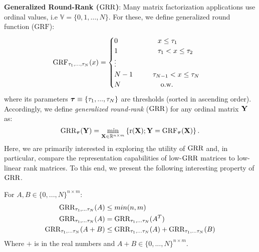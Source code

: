 \documentclass{article}
\newcommand{\sameer}[1]{\todo[color=blue!20]{\textbf{s:} #1}{}}
\newcommand{\para}[1]{\vspace{2mm}\noindent\textbf{#1}:}
\newcommand\tab[1][1cm]{\hspace*{#1}}
\begin{document}
\para{Generalized Round-Rank ($\text{GRR}$)}
\label{sec:rrabk}
Many matrix factorization applications use ordinal values, i.e $\mathbb{V}=\{0,1,\ldots,N\}$. %
For these, we define generalized round function ($\text{GRF}$): %
\begin{align}
\text{GRF}_{\tau_1,...,\tau_N}(x)=
\begin{cases}
               0\tab\tab x \leq \tau_1\\
               1\tab\tab \tau_1 < x \leq \tau_2\\
               \vdots\\
               N-1\tab \tau_{N-1} < x \leq \tau_{N}\\
               N\tab\tab \text{o.w.}
            \end{cases}
\end{align}
where its parameters ${\boldsymbol{\tau}}\equiv\{\tau_1,...,\tau_N\}$ are thresholds (sorted in ascending order). %
Accordingly, we define \emph{generalized round-rank} ($\text{GRR}$) for any ordinal matrix $\mathbf{Y}$ as: 
\[
\text{GRR}_{{\boldsymbol{\tau}}}(\mathbf{Y})=\min_{\mathbf{X}\in{\mathbb{R}}^{n\times m}} \left\{ \mathrm{r}(\mathbf{X}); \mathbf{Y} = \text{GRF}_{{\boldsymbol{\tau}}}(\mathbf{X}) \right\}
.
\]
Here, we are primarily interested in exploring the utility of $\text{GRR}$ and, in particular, compare the representation capabilities of low-$\text{GRR}$ matrices to low-linear rank matrices.
To this end, we present the following interesting property of $\text{GRR}$. %


\iffalse
\begin{thm:lemma}

For $A ,B \in \{0,...,N\}^{n \times m}$:
\begin{align}
\text{GRR}_{\tau_1,...\tau_N}(A) &\leq min(n,m)\\
 \text{GRR}_{\tau_1,...\tau_N}(A) &=\text{GRR}_{\tau_1,...\tau_N}(A^T)\\
 \text{GRR}_{\tau_1,...\tau_N}(A+B) &\leq \text{GRR}_{\tau_1,...\tau_N}(A)+\text{GRR}_{\tau_1,...\tau_N}(B)
\end{align}
Where $+$ is in the real numbers and $A+B \in \{0,...,N\}^{n \times m}$.
\end{thm:lemma}
\end{document}
